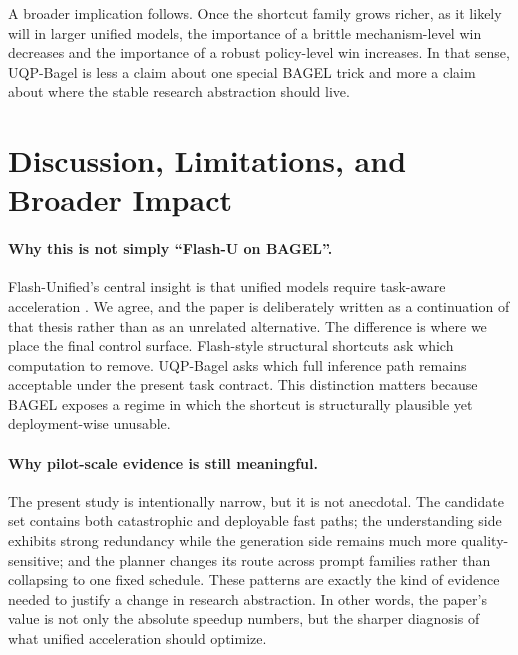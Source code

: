 \documentclass{article}
\begin{document}
A broader implication follows. Once the shortcut family grows richer, as it likely will in larger unified models, the importance of a brittle mechanism-level win decreases and the importance of a robust policy-level win increases. In that sense, UQP-Bagel is less a claim about one special BAGEL trick and more a claim about where the stable research abstraction should live.
\section{Discussion, Limitations, and Broader Impact}
\paragraph{Why this is not simply ``Flash-U on BAGEL''.} Flash-Unified's central insight is that unified models require task-aware acceleration \citep{flash}. We agree, and the paper is deliberately written as a continuation of that thesis rather than as an unrelated alternative. The difference is where we place the final control surface. Flash-style structural shortcuts ask which computation to remove. UQP-Bagel asks which full inference path remains acceptable under the present task contract. This distinction matters because BAGEL exposes a regime in which the shortcut is structurally plausible yet deployment-wise unusable.

\paragraph{Why pilot-scale evidence is still meaningful.} The present study is intentionally narrow, but it is not anecdotal. The candidate set contains both catastrophic and deployable fast paths; the understanding side exhibits strong redundancy while the generation side remains much more quality-sensitive; and the planner changes its route across prompt families rather than collapsing to one fixed schedule. These patterns are exactly the kind of evidence needed to justify a change in research abstraction. In other words, the paper's value is not only the absolute speedup numbers, but the sharper diagnosis of what unified acceleration should optimize.
\end{document}
